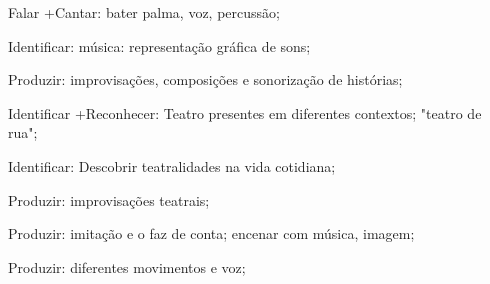  Falar +Cantar: bater palma, voz, percussão; 

 Identificar: música: representação gráfica de sons;

 Produzir: improvisações, composições e sonorização de histórias; 

 Identificar +Reconhecer: Teatro presentes em diferentes contextos; "teatro de rua";

 Identificar: Descobrir teatralidades na vida cotidiana;

 Produzir: improvisações teatrais;

 Produzir: imitação e o faz de conta; encenar com música, imagem; 

 Produzir: diferentes movimentos e voz;

